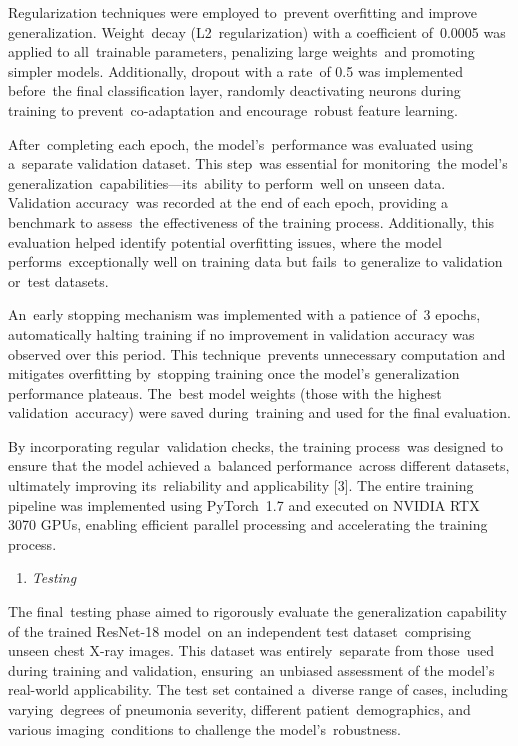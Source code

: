 \documentclass[
  twocolumn,
  10pt,
  a4paper,
  journal
]{IEEEtran}
\begin{document}
Regularization techniques were employed to~prevent overfitting and
improve generalization. Weight~decay (L2~regularization) with a
coefficient of~0.0005 was applied to all~trainable parameters,
penalizing large weights~and promoting simpler models. Additionally,
dropout with a rate~of 0.5 was implemented before~the final
classification layer, randomly deactivating neurons during training to
prevent~co-adaptation and encourage~robust feature learning.

After~completing each epoch, the model's~performance was
evaluated using a~separate validation dataset. This step~was essential
for monitoring~the model's
generalization~capabilities---its~ability to perform~well on unseen
data. Validation accuracy~was recorded at the end of each epoch,
providing a benchmark to assess~the effectiveness of the training
process. Additionally, this evaluation helped identify potential
overfitting issues, where the model performs~exceptionally well on
training data but fails~to generalize to validation or~test datasets.

An~early stopping mechanism was implemented with a patience of~3 epochs,
automatically halting training if no improvement in validation accuracy
was observed over this period. This technique~prevents unnecessary
computation and mitigates overfitting by~stopping training once the
model's generalization performance plateaus. The~best
model weights (those with the highest validation~accuracy) were saved
during~training and used for the final evaluation.

By incorporating regular~validation checks, the training process~was
designed to ensure that the model achieved a~balanced performance~across
different datasets, ultimately improving its~reliability and
applicability {[}3{]}. The entire training pipeline was implemented
using PyTorch~1.7 and executed on NVIDIA RTX 3070 GPUs, enabling
efficient parallel processing and accelerating the training process.

\begin{enumerate}
\def\labelenumi{\Alph{enumi}.}
\setcounter{enumi}{5}
\item
  \emph{Testing}
\end{enumerate}

The final~testing phase aimed to rigorously evaluate the generalization
capability of the trained ResNet-18 model~on an independent test
dataset~comprising unseen chest X-ray images. This dataset was
entirely~separate from those~used during training and validation,
ensuring~an unbiased assessment of the model's
real-world applicability. The test set contained a~diverse range of
cases, including varying~degrees of pneumonia severity, different
patient~demographics, and various imaging~conditions to challenge the
model's~robustness.
\end{document}
